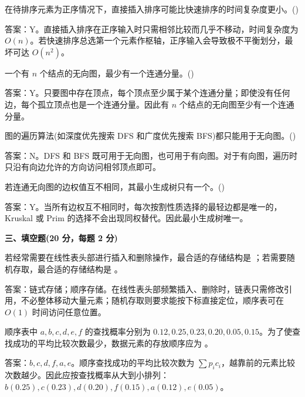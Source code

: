 \begin{question}
在待排序元素为正序情况下，直接插入排序可能比快速排序的时间复杂度更小。(\quad)
\begin{solution}
答案：Y。直接插入排序在正序输入时只需相邻比较而几乎不移动，时间复杂度为 $O(n)$。若快速排序总选第一个元素作枢轴，正序输入会导致极不平衡划分，最坏可达 $O(n^2)$。
\end{solution}
\end{question}

\begin{question}
一个有 $n$ 个结点的无向图，最少有一个连通分量。(\quad)
\begin{solution}
答案：Y。只要图中存在顶点，每个顶点至少属于某个连通分量；即使没有任何边，每个孤立顶点也是一个连通分量。因此有 $n$ 个结点的无向图至少有一个连通分量。
\end{solution}
\end{question}

\begin{question}
图的遍历算法(如深度优先搜索 DFS 和广度优先搜索 BFS)都只能用于无向图。(\quad)
\begin{solution}
答案：N。DFS 和 BFS 既可用于无向图，也可用于有向图。对于有向图，遍历时只沿有向边允许的方向访问相邻顶点即可。
\end{solution}
\end{question}

\begin{question}
若连通无向图的边权值互不相同，其最小生成树只有一个。(\quad)
\begin{solution}
答案：Y。当所有边权互不相同时，每次按割性质选择的最轻边都是唯一的，Kruskal 或 Prim 的选择不会出现同权替代。因此最小生成树唯一。
\end{solution}
\end{question}

\textbf{三、填空题(20 分，每题 2 分)}

\begin{question}
若经常需要在线性表头部进行插入和删除操作，最合适的存储结构是 \blank；若需要随机存取，最合适的存储结构是 \blank。
\begin{solution}
答案：链式存储；顺序存储。在线性表头部频繁插入、删除时，链表只需修改引用，不必整体移动大量元素；随机存取则要求能按下标直接定位，顺序表可在 $O(1)$ 时间访问任意位置。
\end{solution}
\end{question}

\begin{question}
顺序表中 $a,b,c,d,e,f$ 的查找概率分别为 $0.12,0.25,0.23,0.20,0.05,0.15$。为了使查找成功的平均比较次数最少，数据元素的存放顺序应为 \blank。
\begin{solution}
答案：$b,c,d,f,a,e$。顺序查找成功的平均比较次数为 $\sum p_i c_i$，越靠前的元素比较次数越少。因此应按查找概率从大到小排列：$b(0.25),c(0.23),d(0.20),f(0.15),a(0.12),e(0.05)$。
\end{solution}
\end{question}

